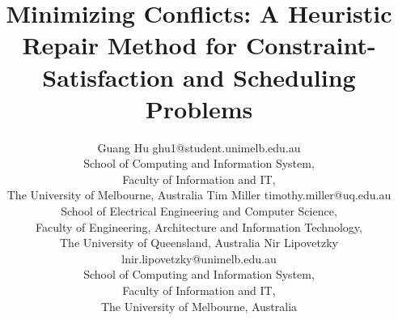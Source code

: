 \documentclass[twoside,11pt]{article}
\begin{document}
\title{Minimizing Conflicts: A Heuristic Repair Method for
       Constraint-Satisfaction and Scheduling Problems}

\author{\name Guang Hu \email ghu1@student.unimelb.edu.au \\
       \addr School of Computing and Information System,\\
        Faculty of Information and IT, \\
       The University of Melbourne, Australia
       \AND
       \name Tim Miller \email timothy.miller@uq.edu.au\\
       \addr School of Electrical Engineering and Computer Science, \\
            Faculty of Engineering, Architecture and Information Technology,\\
            The University of Queensland, Australia
       \AND
       \name Nir Lipovetzky \email lnir.lipovetzky@unimelb.edu.au \\
       \addr School of Computing and Information System,\\
       Faculty of Information and IT, \\
       The University of Melbourne, Australia}


\maketitle


\begin{abstract}

\end{abstract}









\vskip 0.2in


\end{document}
